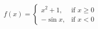 \documentclass{article}
\begin{document}
\begin{equation}
f(x)=
\begin{cases}
x^2 + 1, & \text{if } x \ge 0\\
-\sin x,  & \text{if } x < 0
\end{cases}
\end{equation}
\end{document}
